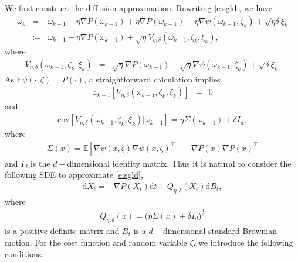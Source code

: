 \documentclass[12pt]{amsart}
\theoremstyle{definition}
\theoremstyle{remark}
\numberwithin{equation}{section}
\newcommand{\dif}{\mathrm{d}}
\newcommand{\cov}{\mathrm{cov}}       %
\newcommand{\E}{\mathbb{E}}            %
\begin{document}
We first construct the diffusion approximation. Rewriting \eqref{e:sgld}, we have
\begin{eqnarray}\label{e:sgld1}
	\omega_k&=&\omega_{k-1}-\eta\nabla P(\omega_{k-1})+\eta\nabla P(\omega_{k-1})-\eta\nabla\psi(\omega_{k-1},\zeta_k)+\sqrt{\eta\delta}\xi_{k}\nonumber\\
	&:=&\omega_{k-1}-\eta\nabla P(\omega_{k-1})+\sqrt\eta V_{\eta,\delta}(\omega_{k-1},\zeta_k,\xi_{k}),
\end{eqnarray}
where 
\begin{eqnarray*}
	V_{\eta,\delta}(\omega_{k-1},\zeta_k,\xi_{k})&=& \sqrt\eta\nabla P(\omega_{k-1})-\sqrt\eta\nabla\psi(\omega_{k-1},\zeta_k)+\sqrt{\delta}\xi_{k}.
\end{eqnarray*}
As  $\E\psi(\cdot,\zeta)=P(\cdot)$, a straightforward calculation implies
\begin{eqnarray*}
	\E_{k-1}[V_{\eta,\delta}(\omega_{k-1},\zeta_k,\xi_{k})]&=&0
\end{eqnarray*}
and
\begin{eqnarray*}
	\cov[V_{\eta,\delta}(\omega_{k-1},\zeta_k,\xi_{k})|\omega_{k-1}]=\eta\Sigma(\omega_{k-1})+\delta I_d,
\end{eqnarray*}
where 
\begin{eqnarray*}
	\Sigma(x)=\E[\nabla\psi(x,\zeta)\nabla\psi(x,\zeta)^\top]-\nabla P(x)\nabla P(x)^\top
\end{eqnarray*}
and $I_d$ is the $d-$dimensional identity matrix. Thus it is natural to consider the following SDE to approximate \eqref{e:sgld}, 
\begin{eqnarray}\label{e:sde1}
	\dif X_t=-\nabla P(X_t)\dif t+Q_{\eta,\delta}(X_t)\dif B_t,
\end{eqnarray}
where 
\begin{eqnarray*}
	Q_{\eta,\delta}(x)=\big(\eta\Sigma(x)+\delta I_d\big)^{\frac12}
\end{eqnarray*}
is a positive definite matrix and $B_t$ is a $d-$dimensional standard Brownian motion. For the cost function and random variable $\zeta$, we introduce the following conditions.
\end{document}
